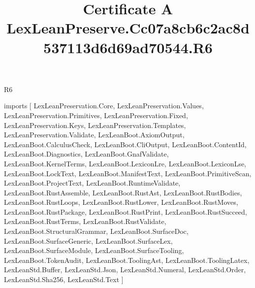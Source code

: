 \begin{lexlean}{R6}
\title{Certificate A LexLeanPreserve.Cc07a8cb6c2ac8d537113d6d69ad70544.R6}
\begin{coremodule}
imports [
  LexLeanPreservation.Core,
  LexLeanPreservation.Values,
  LexLeanPreservation.Primitives,
  LexLeanPreservation.Fixed,
  LexLeanPreservation.Keys,
  LexLeanPreservation.Templates,
  LexLeanPreservation.Validate,
  LexLeanBoot.AxiomOutput,
  LexLeanBoot.CalculusCheck,
  LexLeanBoot.CliOutput,
  LexLeanBoot.ContentId,
  LexLeanBoot.Diagnostics,
  LexLeanBoot.GnafValidate,
  LexLeanBoot.KernelTerms,
  LexLeanBoot.LexiconLre,
  LexLeanBoot.LexiconLse,
  LexLeanBoot.LockText,
  LexLeanBoot.ManifestText,
  LexLeanBoot.PrimitiveScan,
  LexLeanBoot.ProjectText,
  LexLeanBoot.RuntimeValidate,
  LexLeanBoot.RustAssemble,
  LexLeanBoot.RustAst,
  LexLeanBoot.RustBodies,
  LexLeanBoot.RustLoops,
  LexLeanBoot.RustLower,
  LexLeanBoot.RustMoves,
  LexLeanBoot.RustPackage,
  LexLeanBoot.RustPrint,
  LexLeanBoot.RustSucceed,
  LexLeanBoot.RustTerms,
  LexLeanBoot.RustValidate,
  LexLeanBoot.StructuralGrammar,
  LexLeanBoot.SurfaceDoc,
  LexLeanBoot.SurfaceGeneric,
  LexLeanBoot.SurfaceLex,
  LexLeanBoot.SurfaceModule,
  LexLeanBoot.SurfaceTooling,
  LexLeanBoot.TokenAudit,
  LexLeanBoot.ToolingAst,
  LexLeanBoot.ToolingLatex,
  LexLeanStd.Buffer,
  LexLeanStd.Json,
  LexLeanStd.Numeral,
  LexLeanStd.Order,
  LexLeanStd.Sha256,
  LexLeanStd.Text
]


\end{coremodule}
\end{lexlean}
